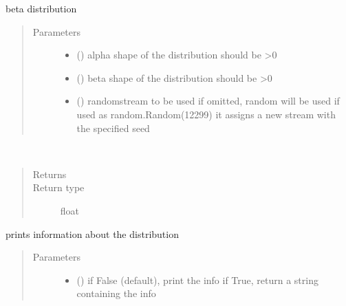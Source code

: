 \documentclass[letterpaper,10pt,english]{sphinxmanual}
\begin{document}
\begin{fulllineitems}
\label{\detokenize{Reference:salabim.Beta}}
beta distribution
\begin{quote}\begin{description}
\item[{Parameters}] \leavevmode\begin{itemize}
\item {} 
 () \textendash{} alpha shape of the distribution 
should be \textgreater{}0

\item {} 
 () \textendash{} beta shape of the distribution 
should be \textgreater{}0

\item {} 
 () \textendash{} randomstream to be used 
if omitted, random will be used 
if used as random.Random(12299)
it assigns a new stream with the specified seed

\end{itemize}

\end{description}\end{quote}

\begin{fulllineitems}
\label{\detokenize{Reference:salabim.Beta.mean}}~\begin{quote}\begin{description}
\item[{Returns}] \leavevmode
{}

\item[{Return type}] \leavevmode
float

\end{description}\end{quote}

\end{fulllineitems}


\begin{fulllineitems}
\label{\detokenize{Reference:salabim.Beta.print_info}}
prints information about the distribution
\begin{quote}\begin{description}
\item[{Parameters}] \leavevmode\begin{itemize}
\item {} 
 () \textendash{} if False (default), print the info
if True, return a string containing the info


\end{itemize}
\end{description}
\end{quote}
\end{fulllineitems}
\end{fulllineitems}
\end{document}
